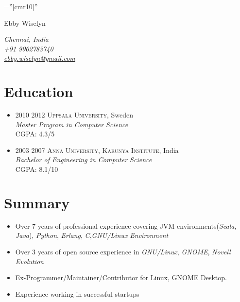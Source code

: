 \documentclass[a4paper,10pt]{article}
\begin{document}

\pagestyle{empty} %

\font\fb=''[cmr10]'' %

\par{\centering
		{\Large Ebby Wiselyn
	        }\smallskip
\par}

\begin{flushright}
  \emph{Chennai, India} \\
  \emph{+91 9962783740} \\
  \emph{\href{mailto:ebby.wiselyn@gmail.com}{ebby.wiselyn@gmail.com}} \\
\end{flushright}

\section{Education}
\begin{itemize}

\item \textsc{2010 2012} \textsc{Uppsala University}, Sweden \\
\emph{Master Program in Computer Science}\\
\normalsize \textsc{CGPA}: 4.3/5

\item \textsc{2003 2007} \textsc{Anna University, Karunya Institute}, India \\
\emph{Bachelor of Engineering in Computer Science}\\
\normalsize \textsc{CGPA}: 8.1/10

\end{itemize}

\section{Summary}
  \begin{itemize}
  \item Over 7 years of professional experience covering JVM environments(\emph{Scala}, \emph{Java}), \emph{Python}, \emph{Erlang}, \emph{C},\emph{GNU/Linux Environment}
  \item Over 3 years of open source experience in \emph{GNU/Linux}, \emph{GNOME}, \emph{Novell Evolution}
  \item Ex-Programmer/Maintainer/Contributor for Linux, GNOME Desktop.
  \item Experience working in successful startups
  \end{itemize}
\end{document}
